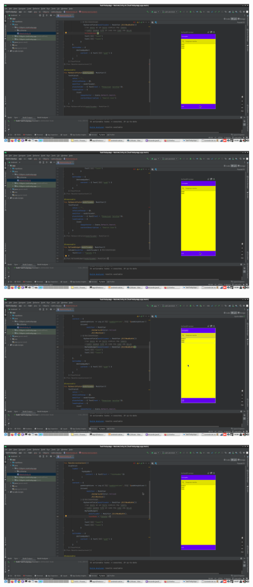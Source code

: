 \documentclass[11pt]{article}
\begin{document}
\begin{center}
\includegraphics[width=.9\linewidth]{./Captura de tela de 2023-03-29 16-55-06.png}
\end{center}
\begin{center}
\includegraphics[width=.9\linewidth]{./Captura de tela de 2023-03-29 16-56-31.png}
\end{center}
\begin{center}
\includegraphics[width=.9\linewidth]{./Captura de tela de 2023-03-29 16-57-00.png}
\end{center}
\begin{center}
\includegraphics[width=.9\linewidth]{./Captura de tela de 2023-03-29 16-57-37.png}
\end{center}
\end{document}
